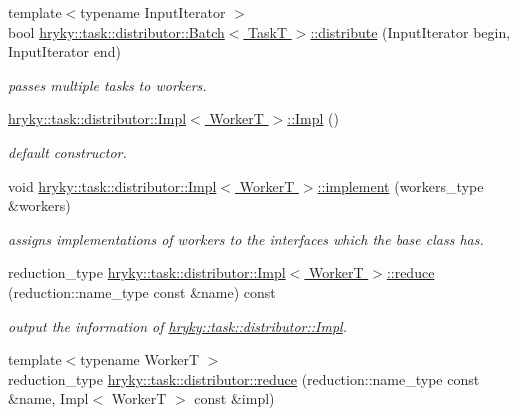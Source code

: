 \begin{DoxyCompactItemize}
{\footnotesize template$<$typename Input\-Iterator $>$ }\\bool \hyperlink{group__task_gaf62dc1e2c3d349ecd67f459d254550fd}{hryky\-::task\-::distributor\-::\-Batch$<$ Task\-T $>$\-::distribute} (Input\-Iterator begin, Input\-Iterator end)
\begin{DoxyCompactList}\small\item\em passes multiple tasks to workers. \end{DoxyCompactList}\item 
\hypertarget{group__task_gaa414ac5e76735f881871f98e288003e0}{\hyperlink{group__task_gaa414ac5e76735f881871f98e288003e0}{hryky\-::task\-::distributor\-::\-Impl$<$ Worker\-T $>$\-::\-Impl} ()}\label{group__task_gaa414ac5e76735f881871f98e288003e0}

\begin{DoxyCompactList}\small\item\em default constructor. \end{DoxyCompactList}\item 
\hypertarget{group__task_gaf3c6d1475b000e7f2cf6b7448fc2dfdc}{void \hyperlink{group__task_gaf3c6d1475b000e7f2cf6b7448fc2dfdc}{hryky\-::task\-::distributor\-::\-Impl$<$ Worker\-T $>$\-::implement} (workers\-\_\-type \&workers)}\label{group__task_gaf3c6d1475b000e7f2cf6b7448fc2dfdc}

\begin{DoxyCompactList}\small\item\em assigns implementations of workers to the interfaces which the base class has. \end{DoxyCompactList}\item 
\hypertarget{group__task_ga0170ebe627b3f2a67912e5b237994b9d}{reduction\-\_\-type \hyperlink{group__task_ga0170ebe627b3f2a67912e5b237994b9d}{hryky\-::task\-::distributor\-::\-Impl$<$ Worker\-T $>$\-::reduce} (reduction\-::name\-\_\-type const \&name) const }\label{group__task_ga0170ebe627b3f2a67912e5b237994b9d}

\begin{DoxyCompactList}\small\item\em output the information of \hyperlink{classhryky_1_1task_1_1distributor_1_1_impl}{hryky\-::task\-::distributor\-::\-Impl}. \end{DoxyCompactList}\item 
\hypertarget{group__task_gaee44063e86225742b935c19f76d7d7c4}{{\footnotesize template$<$typename Worker\-T $>$ }\\reduction\-\_\-type \hyperlink{group__task_gaee44063e86225742b935c19f76d7d7c4}{hryky\-::task\-::distributor\-::reduce} (reduction\-::name\-\_\-type const \&name, Impl$<$ Worker\-T $>$ const \&impl)}\label{group__task_gaee44063e86225742b935c19f76d7d7c4}


\end{DoxyCompactItemize}
